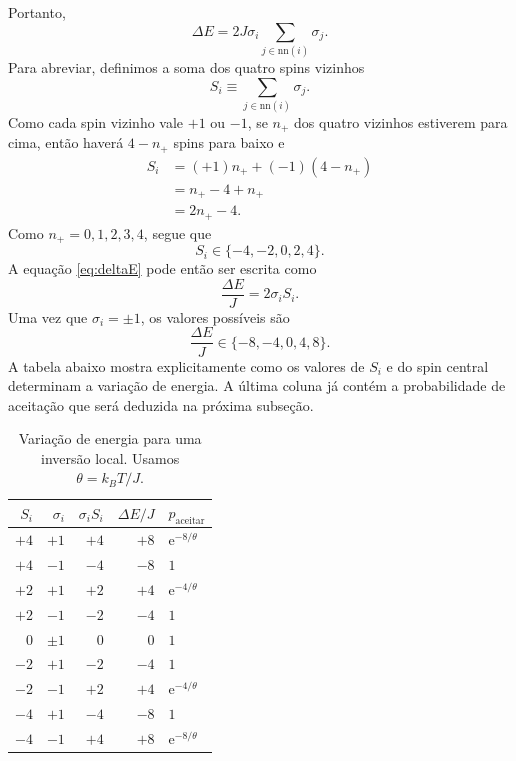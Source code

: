 \documentclass[12pt,a4paper]{article}
\newcommand{\e}[1]{\mathrm{e}^{#1}}
\newcommand{\nn}{\mathrm{nn}}
\newcommand{\thetaT}{\theta}
\begin{document}
%
Portanto,
%
\begin{equation}
    \Delta E=2J\sigma_i\sum_{j\in\nn(i)}\sigma_j.
    \label{eq:deltaE}
\end{equation}
%
Para abreviar, definimos a soma dos quatro spins vizinhos
%
\begin{equation}
    S_i\equiv\sum_{j\in\nn(i)}\sigma_j.
    \label{eq:Si}
\end{equation}
%
Como cada spin vizinho vale $+1$ ou $-1$, se $n_+$ dos quatro vizinhos estiverem para cima, então haverá $4-n_+$ spins para baixo e
%
\begin{align}
    S_i&=(+1)n_+ +(-1)(4-n_+)\\
       &=n_+-4+n_+\\
       &=2n_+-4.
\end{align}
%
Como $n_+=0,1,2,3,4$, segue que
%
\begin{equation}
    S_i\in\{-4,-2,0,2,4\}.
\end{equation}
%
A equação \eqref{eq:deltaE} pode então ser escrita como
%
\begin{equation}
    \frac{\Delta E}{J}=2\sigma_i S_i.
\end{equation}
%
Uma vez que $\sigma_i=\pm1$, os valores possíveis são
%
\begin{equation}
    \frac{\Delta E}{J}\in\{-8,-4,0,4,8\}.
    \label{eq:deltaEpossiveis}
\end{equation}
%
A tabela abaixo mostra explicitamente como os valores de $S_i$ e do spin central determinam a variação de energia. A última coluna já contém a probabilidade de aceitação que será deduzida na próxima subseção.
%
\begin{table}[H]
\centering
\caption{Variação de energia para uma inversão local. Usamos $\thetaT=k_BT/J$.}
\label{tab:deltaE}
\begin{tabular}{rrrrl}
\toprule
$S_i$ & $\sigma_i$ & $\sigma_iS_i$ & $\Delta E/J$ & $p_{\mathrm{aceitar}}$\\
\midrule
$+4$ & $+1$ & $+4$ & $+8$ & $\e{{-8/\thetaT}}$\\
$+4$ & $-1$ & $-4$ & $-8$ & $1$\\
$+2$ & $+1$ & $+2$ & $+4$ & $\e{{-4/\thetaT}}$\\
$+2$ & $-1$ & $-2$ & $-4$ & $1$\\
$0$  & $\pm1$& $0$  & $0$  & $1$\\
$-2$ & $+1$ & $-2$ & $-4$ & $1$\\
$-2$ & $-1$ & $+2$ & $+4$ & $\e{-4/\thetaT}$\\
$-4$ & $+1$ & $-4$ & $-8$ & $1$\\
$-4$ & $-1$ & $+4$ & $+8$ & $\e{-8/\thetaT}$\\
\bottomrule
\end{tabular}
\end{table}
\end{document}
